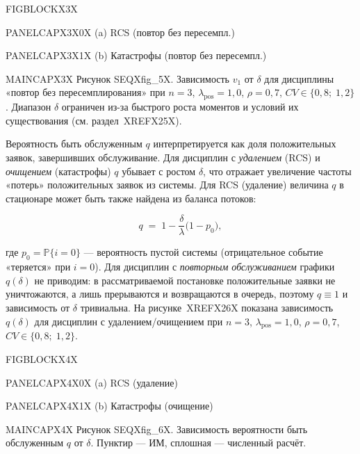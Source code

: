 \noindent FIGBLOCKX3X\par

\noindent PANELCAPX3X0X (a) RCS (повтор без пересемпл.)\par

\noindent PANELCAPX3X1X (b) Катастрофы (повтор без пересемпл.)\par

\noindent MAINCAPX3X Рисунок SEQXfig_5X. Зависимость \(v_1\) от \(\delta\) для дисциплины «повтор без пересемплирования» при \(n=3\), \(\lambda_{\text{pos}}=1{,}0\), \(\rho=0{,}7\), \(CV\in\{0{,}8;\;1{,}2\}\). Диапазон \(\delta\) ограничен из-за быстрого роста моментов и условий их существования (см. раздел~XREFX25X).\par

Вероятность быть обслуженным \(q\) интерпретируется как доля положительных заявок, завершивших обслуживание. Для дисциплин с \emph{удалением} (RCS) и \emph{очищением} (катастрофы) \(q\) убывает с ростом \(\delta\), что отражает увеличение частоты «потерь» положительных заявок из системы. Для RCS (удаление) величина \(q\) в стационаре может быть также найдена из баланса потоков:


\[q \;=\; 1 - \frac{\delta}{\lambda}\bigl(1-p_0\bigr),\]


где \(p_0=\mathbb{P}\{i=0\}\) --- вероятность пустой системы (отрицательное событие «теряется» при \(i=0\)). Для дисциплин с \emph{повторным обслуживанием} графики \(q(\delta)\) не приводим: в рассматриваемой постановке положительные заявки не уничтожаются, а лишь прерываются и возвращаются в очередь, поэтому \(q\equiv 1\) и зависимость от \(\delta\) тривиальна. На рисунке~XREFX26X показана зависимость \(q(\delta)\) для дисциплин с удалением/очищением при \(n=3\), \(\lambda_{\text{pos}}=1{,}0\), \(\rho=0{,}7\), \(CV\in\{0{,}8;\;1{,}2\}\).

\noindent FIGBLOCKX4X\par

\noindent PANELCAPX4X0X (a) RCS (удаление)\par

\noindent PANELCAPX4X1X (b) Катастрофы (очищение)\par

\noindent MAINCAPX4X Рисунок SEQXfig_6X. Зависимость вероятности быть обслуженным \(q\) от \(\delta\). Пунктир --- ИМ, сплошная --- численный расчёт.\par
\FloatBarrier




